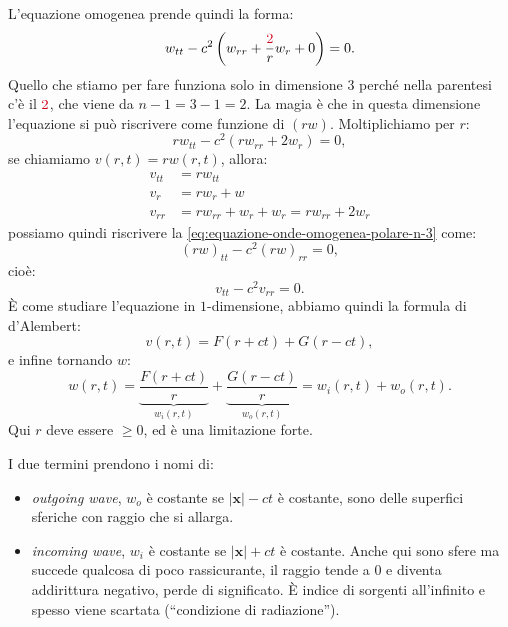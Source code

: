 \documentclass[10pt,a4paper,twoside,openright]{book}
\newcommand{\x}{\mathbf{x}}
\begin{document}
L'equazione omogenea prende quindi la forma:
\begin{equation}
    w_{tt} -c^{2}\left(w_{rr} +\frac{\textcolor[rgb]{0.82,0.01,0.11}{2}}{r} w_{r} +0\right) =0.
    \label{eq:equazione-onde-omogenea-polare-n-3}
\end{equation}
Quello che stiamo per fare funziona solo in dimensione $3$ perché nella parentesi c'è il $\textcolor[rgb]{0.82,0.01,0.11}{2}$, che viene da $n-1=3-1=2$. La magia è che in questa dimensione l'equazione si può riscrivere come funzione di $(rw)$. Moltiplichiamo per $r$:
\begin{equation*}
    rw_{tt} -c^{2}(rw_{rr} +2w_{r}) =0,
\end{equation*}
se chiamiamo $v(r,t) =rw(r,t)$, allora:
\begin{align*}
    v_{tt} & =rw_{tt}                                \\
    v_{r}  & =rw_{r} +w                              \\
    v_{rr} & =rw_{rr} +w_{r} +w_{r} =rw_{rr} +2w_{r}
\end{align*}
possiamo quindi riscrivere la \eqref{eq:equazione-onde-omogenea-polare-n-3} come:
\begin{equation}
    (rw)_{tt} -c^{2}(rw)_{rr} =0,
\end{equation}
cioè:
\begin{equation}
    v_{tt} -c^{2} v_{rr} =0.
\end{equation}
È come studiare l'equazione in $1$-dimensione, abbiamo quindi la formula di d'Alembert:
\begin{equation}
    v(r,t) =F(r+ct) +G(r-ct) ,
\end{equation}
e infine tornando $w$:
\begin{equation}
    \boxed{w(r,t) =\underbrace{\frac{F(r+ct)}{r}}_{w_{i}(r,t)} +\underbrace{\frac{G(r-ct)}{r}}_{w_{o}(r,t)} =w_{i}(r,t) +w_{o}(r,t)} .
\end{equation}
Qui $r$ deve essere $\geqslant 0$, ed è una limitazione forte.

I due termini prendono i nomi di:
\begin{itemize}
    \item \textit{outgoing wave}, $w_{o}$ è costante se $| \x| -ct$ è costante, sono delle superfici sferiche con raggio che si allarga.
    \item \textit{incoming wave}, $w_{i}$ è costante se $| \x| +ct$ è costante. Anche qui sono sfere ma succede qualcosa di poco rassicurante, il raggio tende a $0$ e diventa addirittura negativo, perde di significato. È indice di sorgenti all'infinito e spesso viene scartata (``condizione di radiazione'').
\end{itemize}
\end{document}
